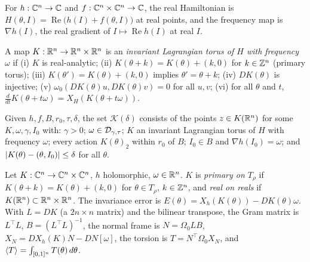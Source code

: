 \begin{definition}\label{bp:p0:nearlyintegrable}
For $h:\mathbb{C}^n\to\mathbb{C}$ and $f:\mathbb{C}^n\times\mathbb{C}^n\to\mathbb{C}$, the real Hamiltonian is
$H(\theta,I)=\operatorname{Re}\bigl(h(I)+f(\theta,I)\bigr)$ at real points, and the frequency map
is $\nabla h(I)$, the real gradient of $I\mapsto\operatorname{Re}h(I)$ at real $I$.
\end{definition}

\begin{definition}\label{bp:p0:torus}
A map $K:\mathbb{R}^n\to\mathbb{R}^n\times\mathbb{R}^n$ is an \emph{invariant Lagrangian torus of $H$ with frequency
$\omega$} if (i) $K$ is real-analytic; (ii) $K(\theta+k)=K(\theta)+(k,0)$ for $k\in\mathbb{Z}^n$
(primary torus); (iii) $K(\theta')=K(\theta)+(k,0)$ implies $\theta'=\theta+k$; (iv) $DK(\theta)$
is injective; (v) $\omega_0(DK(\theta)u,DK(\theta)v)=0$ for all $u,v$; (vi) for all $\theta$ and
$t$, $\frac{d}{dt}K(\theta+t\omega)=X_H(K(\theta+t\omega))$.
\end{definition}

\begin{definition}\label{bp:p0:cover}
Given $h,f,B,r_0,\tau,\delta$, the set $\mathcal{K}(\delta)$ consists of the points $z\in K(\mathbb{R}^n)$
for some $K,\omega,\gamma,I_0$ with: $\gamma>0$; $\omega\in\mathcal{D}_{\gamma,\tau}$; $K$ an invariant
Lagrangian torus of $H$ with frequency $\omega$; every action $K(\theta)_2$ within $r_0$ of $B$;
$I_0\in B$ and $\nabla h(I_0)=\omega$; and $\lvert K(\theta)-(\theta,I_0)\rvert\le\delta$ for all $\theta$.
\end{definition}

\begin{definition}\label{bp:p0:stripdata}
Let $K:\mathbb{C}^n\to\mathbb{C}^n\times\mathbb{C}^n$, $h$ holomorphic, $\omega\in\mathbb{R}^n$. $K$ is \emph{primary on $T_\rho$}
if $K(\theta+k)=K(\theta)+(k,0)$ for $\theta\in T_\rho$, $k\in\mathbb{Z}^n$, and \emph{real on reals} if
$K(\mathbb{R}^n)\subset\mathbb{R}^n\times\mathbb{R}^n$. The invariance error is $E(\theta)=X_h(K(\theta))-DK(\theta)\omega$.
With $L=DK$ (a $2n\times n$ matrix) and the bilinear transpose, the Gram matrix is $L^\top L$,
$B=(L^\top L)^{-1}$, the normal frame is $N=\Omega_0LB$, $X_N=DX_h(K)N-DN[\omega]$, the torsion is
$T=N^\top\Omega_0X_N$, and $\langle T\rangle=\int_{[0,1]^n}T(\theta)\,d\theta$.
\end{definition}

